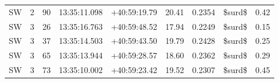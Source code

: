 \begin{tabular}{lrrllrrlr}
  SW &       2 &     90 &  13:35:11.098 &  +40:59:19.79 &  20.41 &    0.2354 &     \$surd\$ &        0.42 \\
  SW &       3 &     26 &  13:35:16.763 &  +40:59:48.52 &  17.94 &    0.2249 &     \$surd\$ &        0.15 \\
  SW &       3 &     37 &  13:35:14.503 &  +40:59:43.50 &  19.79 &    0.2428 &     \$surd\$ &        0.25 \\
  SW &       3 &     65 &  13:35:13.944 &  +40:59:28.57 &  18.60 &    0.2362 &     \$surd\$ &        0.29 \\
  SW &       3 &     73 &  13:35:10.002 &  +40:59:23.42 &  19.52 &    0.2307 &     \$surd\$ &        0.45 \\
\bottomrule
\end{tabular}
